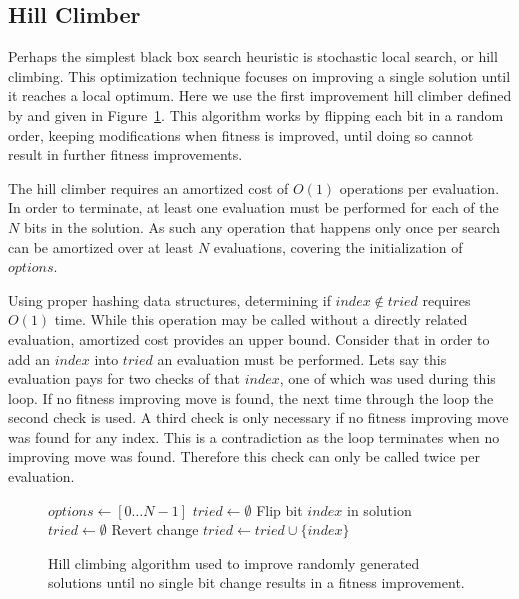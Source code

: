 \documentclass[twoside]{article}
\begin{document}
\subsection{Hill Climber}
Perhaps the simplest black box search heuristic is stochastic local search, or hill climbing.
This optimization technique focuses on improving a single solution until it reaches a local
optimum. Here we use the first improvement hill climber defined by \cite{goldman:2014:p3}
and given in Figure~\ref{fig-hc}. This algorithm works by flipping each bit in a random
order, keeping modifications when fitness is improved, until doing so cannot result in
further fitness improvements.

The hill climber requires an amortized cost of $O(1)$ operations per evaluation. In order to
terminate, at least one evaluation must be performed for each of the $N$ bits in the solution.
As such any operation that happens only once per search can be amortized over at least $N$
evaluations, covering the initialization of $options$.

Using proper hashing data structures, determining if $index \notin tried$ requires $O(1)$
time. While this operation may be called without a directly related evaluation, amortized cost
provides an upper bound. Consider that in order to add an $index$ into $tried$ an evaluation must
be performed. Lets say this evaluation pays for two checks of that $index$, one of which was used
during this loop. If no fitness improving move is found, the next time through the loop the second check
is used. A third check is only necessary if no fitness improving move was found for any index.
This is a contradiction as the loop terminates when no improving move was found. Therefore this check
can only be called twice per evaluation.



\begin{figure}
  \begin{algorithmic}[1]
    \State $options \leftarrow [0 \dots N-1]$
    \State $tried \leftarrow \emptyset$
          \State Flip bit $index$ in solution
            \State $tried \leftarrow \emptyset$
          \Else
            \State Revert change
          \EndIf
          \State $tried \leftarrow tried \cup \{index\}$
        \EndIf
      \EndFor
    \EndWhile
  \EndProcedure
\end{algorithmic}
  \caption{Hill climbing algorithm used to improve randomly generated solutions until no single
           bit change results in a fitness improvement.}
  \label{fig-hc}
\end{figure}
\end{document}
